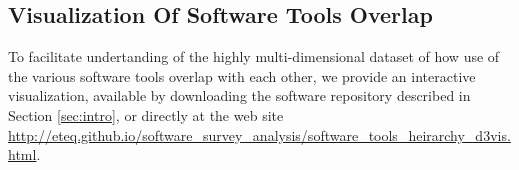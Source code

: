 \subsection{Visualization Of Software Tools Overlap}
\label{ssec:d3viz}

To facilitate undertanding of the highly multi-dimensional dataset of how use of the various software tools overlap with each other, we provide an interactive visualization, available by downloading the software repository described in Section \ref{sec:intro}, or directly at the web site \url{http://eteq.github.io/software_survey_analysis/software_tools_heirarchy_d3vis.html}.